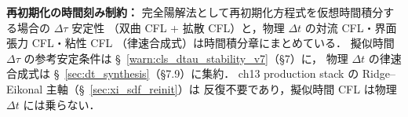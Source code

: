 
\medskip
\noindent\textbf{再初期化の時間刻み制約：}
完全陽解法として再初期化方程式を仮想時間積分する場合の $\Delta\tau$ 安定性
（双曲 CFL + 拡散 CFL）と，物理 $\Delta t$ の対流 CFL・界面張力 CFL・粘性 CFL
（律速合成式）は時間積分章にまとめている．
擬似時間 $\Delta\tau$ の参考安定条件は \S~\ref{warn:cls_dtau_stability_v7}（§7）に，
物理 $\Delta t$ の律速合成式は \S~\ref{sec:dt_synthesis}（§7.9）に集約．
ch13 production stack の Ridge--Eikonal 主軸（\S~\ref{sec:xi_sdf_reinit}）は
反復不要であり，擬似時間 CFL は物理 $\Delta t$ には乗らない．
